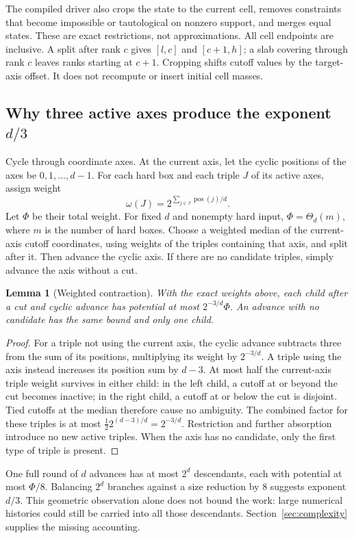 \documentclass[12pt,a4paper]{article}
\newtheorem{lemma}[theorem]{Lemma}
\theoremstyle{definition}
\begin{document}
The compiled driver also crops the state to the current cell, removes
constraints that become impossible or tautological on nonzero support,
and merges equal states. These are exact restrictions, not approximations.
All cell endpoints are inclusive. A split after rank $c$ gives
$[l,c]$ and $[c+1,h]$; a slab covering through rank $c$ leaves ranks
starting at $c+1$. Cropping shifts cutoff values by the target-axis
offset. It does not recompute or insert initial cell masses.

\subsection{Why three active axes produce the exponent $d/3$}
Cycle through coordinate axes. At the current axis, let the cyclic
positions of the axes be $0,1,\ldots,d-1$. For each hard box and each
triple $J$ of its active axes, assign weight
\[
                     \omega(J)=2^{\sum_{j\in J}\operatorname{pos}(j)/d}.
\]
Let $\Phi$ be their total weight. For fixed $d$ and nonempty hard input,
$\Phi=\Theta_d(m)$, where $m$ is the number of hard boxes.
Choose a weighted median of the current-axis cutoff coordinates,
using weights of the triples containing that axis, and split after it.
Then advance the cyclic axis. If there are no candidate triples, simply
advance the axis without a cut.

\begin{lemma}[Weighted contraction]\label{lem:potential}
With the exact weights above, each child after a cut and cyclic advance
has potential at most $2^{-3/d}\Phi$. An advance with no candidate has
the same bound and only one child.
\end{lemma}
\begin{proof}
For a triple not using the current axis, the cyclic advance subtracts
three from the sum of its positions, multiplying its weight by
$2^{-3/d}$. A triple using the axis instead increases its position sum
by $d-3$. At most half the current-axis triple weight survives in either
child: in the left child, a cutoff at or beyond the cut becomes inactive;
in the right child, a cutoff at or below the cut is disjoint. Tied cutoffs
at the median therefore cause no ambiguity. The combined factor for these
triples is at most $\tfrac12 2^{(d-3)/d}=2^{-3/d}$.
Restriction and further absorption introduce no new active triples.
When the axis has no candidate, only the first type of triple is present.
\end{proof}

One full round of $d$ advances has at most $2^d$ descendants, each with
potential at most $\Phi/8$. Balancing $2^d$ branches against a size
reduction by $8$ suggests exponent $d/3$. This geometric observation
alone does not bound the work: large numerical histories could still be
carried into all those descendants. Section~\ref{sec:complexity} supplies
the missing accounting.
\end{document}
